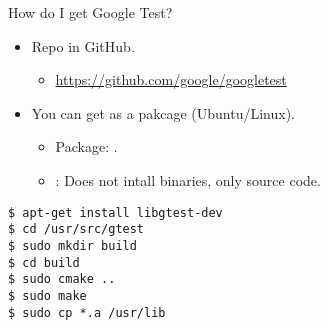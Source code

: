\begin{frame}[t,fragile]{How do I get Google Test?}
\begin{itemize}
  \item Repo in GitHub.
    \begin{itemize}
      \item \url{https://github.com/google/googletest}
    \end{itemize}
  \vfill
  \item You can get as a pakcage (Ubuntu/Linux).
    \begin{itemize}
      \item Package: .
      \item {}: Does not intall binaries, only source code.
    \end{itemize}
\end{itemize}
\begin{lstlisting}[style=terminal]
$ apt-get install libgtest-dev
$ cd /usr/src/gtest
$ sudo mkdir build
$ cd build
$ sudo cmake ..
$ sudo make
$ sudo cp *.a /usr/lib
\end{lstlisting}
\end{frame}
